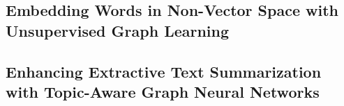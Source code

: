 \subsection{Embedding Words in Non-Vector Space with Unsupervised Graph Learning}


\subsection{Enhancing Extractive Text Summarization with Topic-Aware Graph Neural Networks}
